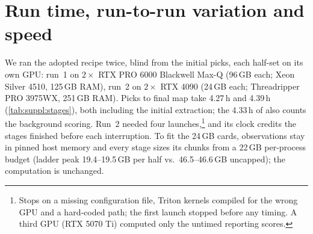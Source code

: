 \section{Run time, run-to-run variation and speed}
\label{sec:suppl:timing}

We ran the adopted recipe twice, blind from the initial picks, each half-set on its own GPU: run~1 on $2\times$ RTX PRO 6000 Blackwell Max-Q (96\,GB each; Xeon Silver 4510, 125\,GB RAM), run~2 on $2\times$ RTX 4090 (24\,GB each; Threadripper PRO 3975WX, 251\,GB RAM).
Picks to final map take 4.27\,h and 4.39\,h (\cref{tab:suppl:stages}), both including the initial extraction; the 4.33\,h of  also counts the background scoring. Run~2 needed four launches,\footnote{Stops on a missing configuration file, Triton kernels compiled for the wrong GPU and a hard-coded path; the first launch stopped before any timing. A third GPU (RTX 5070 Ti) computed only the untimed reporting scores.} and its clock credits the stages finished before each interruption.
To fit the 24\,GB cards, observations stay in pinned host memory and every stage sizes its chunks from a 22\,GB per-process budget (ladder peak 19.4--19.5\,GB per half vs.\ 46.5--46.6\,GB uncapped); the computation is unchanged.

